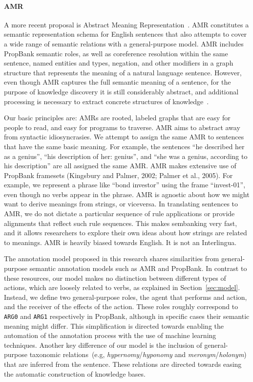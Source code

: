 \paragraph{AMR}

  A more recent proposal is Abstract Meaning Representation~\cite[ARM]{amr}. AMR constitutes a semantic representation schema for English sentences that also attempts to cover a wide range of semantic relations with a general-purpose model.
  AMR includes PropBank semantic roles, as well as coreference resolution within the same sentence, named entities and types, negation, and other modifiers in a graph structure that represents the meaning of a natural language sentence.
  However, even though AMR captures the full semantic meaning of a sentence, for the purpose of knowledge discovery it is still considerably abstract, and additional processing is necessary to extract concrete structures of knowledge~\cite{rao2017biomedical}.

  Our basic principles are:
AMRs are rooted, labeled graphs that are easy for people to read, and easy for programs to traverse.
AMR aims to abstract away from syntactic idiosyncrasies. We attempt to assign the
same AMR to sentences that have the same basic meaning. For example, the sentences “he described her as a genius”, “his description of her: genius”, and “she was a genius, according to his description” are all assigned the same AMR.
AMR makes extensive use of PropBank framesets (Kingsbury and Palmer, 2002; Palmer et al., 2005). For example, we represent a phrase like “bond investor” using the frame “invest-01”, even though no verbs appear in the phrase.
AMR is agnostic about how we might want to derive meanings from strings, or viceversa. In translating sentences to AMR, we do not dictate a particular sequence of rule applications or provide alignments that reflect such rule sequences. This makes sembanking very fast, and it allows researchers to explore their own ideas about how strings are related to meanings.
AMR is heavily biased towards English. It is not an Interlingua.

  The annotation model proposed in this research shares similarities from general-purpose semantic annotation models such as AMR and PropBank.
  In contrast to these resources, our model makes no distinction between different types of actions, which are loosely related to verbs, as explained in Section~\ref{sec:model}. Instead, we define two general-purpose roles, the agent that performs and action, and the receiver of the effects of the action. These roles roughly correspond to \texttt{ARG0} and \texttt{ARG1} respectively in PropBank, although in specific cases their semantic meaning might differ.
  This simplification is directed towards enabling the automation of the annotation process with the use of machine learning techniques.
  Another key difference of our model is the inclusion of general-purpose taxonomic relations~(e.g, \textit{hypernomy}/\textit{hyponomy} and \textit{meronym}/\textit{holonym}) that are inferred from the sentence. These relations are directed towards easing the automatic construction of knowledge bases.

